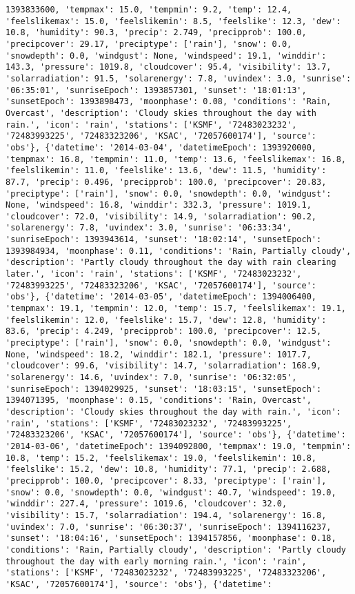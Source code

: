 \documentclass[
  letterpaper,
  DIV=11,
  numbers=noendperiod]{scrartcl}
\begin{document}
\begin{verbatim}
1393833600, 'tempmax': 15.0, 'tempmin': 9.2, 'temp': 12.4, 'feelslikemax': 15.0, 'feelslikemin': 8.5, 'feelslike': 12.3, 'dew': 10.8, 'humidity': 90.3, 'precip': 2.749, 'precipprob': 100.0, 'precipcover': 29.17, 'preciptype': ['rain'], 'snow': 0.0, 'snowdepth': 0.0, 'windgust': None, 'windspeed': 19.1, 'winddir': 143.3, 'pressure': 1019.8, 'cloudcover': 95.4, 'visibility': 13.7, 'solarradiation': 91.5, 'solarenergy': 7.8, 'uvindex': 3.0, 'sunrise': '06:35:01', 'sunriseEpoch': 1393857301, 'sunset': '18:01:13', 'sunsetEpoch': 1393898473, 'moonphase': 0.08, 'conditions': 'Rain, Overcast', 'description': 'Cloudy skies throughout the day with rain.', 'icon': 'rain', 'stations': ['KSMF', '72483023232', '72483993225', '72483323206', 'KSAC', '72057600174'], 'source': 'obs'}, {'datetime': '2014-03-04', 'datetimeEpoch': 1393920000, 'tempmax': 16.8, 'tempmin': 11.0, 'temp': 13.6, 'feelslikemax': 16.8, 'feelslikemin': 11.0, 'feelslike': 13.6, 'dew': 11.5, 'humidity': 87.7, 'precip': 0.496, 'precipprob': 100.0, 'precipcover': 20.83, 'preciptype': ['rain'], 'snow': 0.0, 'snowdepth': 0.0, 'windgust': None, 'windspeed': 16.8, 'winddir': 332.3, 'pressure': 1019.1, 'cloudcover': 72.0, 'visibility': 14.9, 'solarradiation': 90.2, 'solarenergy': 7.8, 'uvindex': 3.0, 'sunrise': '06:33:34', 'sunriseEpoch': 1393943614, 'sunset': '18:02:14', 'sunsetEpoch': 1393984934, 'moonphase': 0.11, 'conditions': 'Rain, Partially cloudy', 'description': 'Partly cloudy throughout the day with rain clearing later.', 'icon': 'rain', 'stations': ['KSMF', '72483023232', '72483993225', '72483323206', 'KSAC', '72057600174'], 'source': 'obs'}, {'datetime': '2014-03-05', 'datetimeEpoch': 1394006400, 'tempmax': 19.1, 'tempmin': 12.0, 'temp': 15.7, 'feelslikemax': 19.1, 'feelslikemin': 12.0, 'feelslike': 15.7, 'dew': 12.8, 'humidity': 83.6, 'precip': 4.249, 'precipprob': 100.0, 'precipcover': 12.5, 'preciptype': ['rain'], 'snow': 0.0, 'snowdepth': 0.0, 'windgust': None, 'windspeed': 18.2, 'winddir': 182.1, 'pressure': 1017.7, 'cloudcover': 99.6, 'visibility': 14.7, 'solarradiation': 168.9, 'solarenergy': 14.6, 'uvindex': 7.0, 'sunrise': '06:32:05', 'sunriseEpoch': 1394029925, 'sunset': '18:03:15', 'sunsetEpoch': 1394071395, 'moonphase': 0.15, 'conditions': 'Rain, Overcast', 'description': 'Cloudy skies throughout the day with rain.', 'icon': 'rain', 'stations': ['KSMF', '72483023232', '72483993225', '72483323206', 'KSAC', '72057600174'], 'source': 'obs'}, {'datetime': '2014-03-06', 'datetimeEpoch': 1394092800, 'tempmax': 19.0, 'tempmin': 10.8, 'temp': 15.2, 'feelslikemax': 19.0, 'feelslikemin': 10.8, 'feelslike': 15.2, 'dew': 10.8, 'humidity': 77.1, 'precip': 2.688, 'precipprob': 100.0, 'precipcover': 8.33, 'preciptype': ['rain'], 'snow': 0.0, 'snowdepth': 0.0, 'windgust': 40.7, 'windspeed': 19.0, 'winddir': 227.4, 'pressure': 1019.6, 'cloudcover': 32.0, 'visibility': 15.7, 'solarradiation': 194.4, 'solarenergy': 16.8, 'uvindex': 7.0, 'sunrise': '06:30:37', 'sunriseEpoch': 1394116237, 'sunset': '18:04:16', 'sunsetEpoch': 1394157856, 'moonphase': 0.18, 'conditions': 'Rain, Partially cloudy', 'description': 'Partly cloudy throughout the day with early morning rain.', 'icon': 'rain', 'stations': ['KSMF', '72483023232', '72483993225', '72483323206', 'KSAC', '72057600174'], 'source': 'obs'}, {'datetime': 
\end{verbatim}
\end{document}
